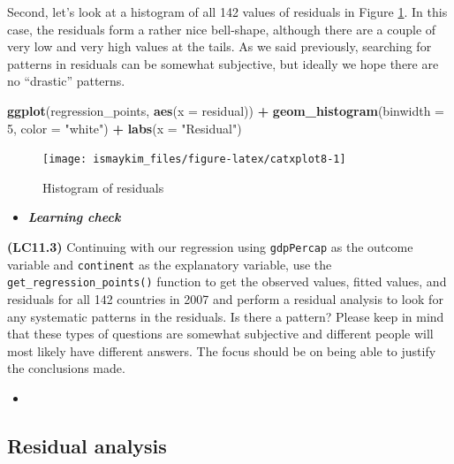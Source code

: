 \documentclass[12pt, krantz2,]{krantz}
\makeatletter
\newenvironment{Shaded}{\begin{snugshade}}{\end{snugshade}}
\newcommand{\DataTypeTok}[1]{\textcolor[rgb]{0.27,0.27,0.27}{#1}}
\newcommand{\DecValTok}[1]{\textcolor[rgb]{0.06,0.06,0.06}{#1}}
\newcommand{\KeywordTok}[1]{\textcolor[rgb]{0.27,0.27,0.27}{\textbf{#1}}}
\newcommand{\NormalTok}[1]{#1}
\newcommand{\OperatorTok}[1]{\textcolor[rgb]{0.43,0.43,0.43}{\textbf{#1}}}
\newcommand{\StringTok}[1]{\textcolor[rgb]{0.5,0.5,0.5}{#1}}
\newenvironment{kframe}{%
\medskip{}
\setlength{\fboxsep}{.8em}
 \def\at@end@of@kframe{}%
 \ifinner\ifhmode%
  \def\at@end@of@kframe{\end{minipage}}%
  \begin{minipage}{\columnwidth}%
 \fi\fi%
 \def\FrameCommand##1{\hskip\@totalleftmargin \hskip-\fboxsep
 \colorbox{shadecolor}{##1}\hskip-\fboxsep
     \hskip-\linewidth \hskip-\@totalleftmargin \hskip\columnwidth}%
 \MakeFramed {\advance\hsize-\width
   \@totalleftmargin\z@ \linewidth\hsize
   \@setminipage}}%
 {\par\unskip\endMakeFramed%
 \at@end@of@kframe}
\renewenvironment{Shaded}{\begin{kframe}}{\end{kframe}}
\newenvironment{rmdblock}[1]
  {\begin{shaded*}
  \begin{itemize}
  \renewcommand{\labelitemi}{
    \raisebox{-.7\height}[0pt][0pt]{
    }
  }
  \item
  }
  {
  \end{itemize}
  \end{shaded*}
  }
\newenvironment{learncheck}
  {\begin{rmdblock}{warning}}
  {\end{rmdblock}}
\makeatother
\begin{document}
Second, let's look at a histogram of all 142 values of
residuals in Figure \ref{fig:catxplot8}. In this case, the residuals form a
rather nice bell-shape, although there are a couple of very low and very high
values at the tails. As we said previously, searching for patterns in residuals
can be somewhat subjective, but ideally we hope there are no ``drastic'' patterns.

\begin{Shaded}
\begin{Highlighting}[]
\KeywordTok{ggplot}\NormalTok{(regression_points, }\KeywordTok{aes}\NormalTok{(}\DataTypeTok{x =}\NormalTok{ residual)) }\OperatorTok{+}
\StringTok{  }\KeywordTok{geom_histogram}\NormalTok{(}\DataTypeTok{binwidth =} \DecValTok{5}\NormalTok{, }\DataTypeTok{color =} \StringTok{"white"}\NormalTok{) }\OperatorTok{+}
\StringTok{  }\KeywordTok{labs}\NormalTok{(}\DataTypeTok{x =} \StringTok{"Residual"}\NormalTok{)}
\end{Highlighting}
\end{Shaded}

\begin{figure}

{\centering \texttt{[image: ismaykim\_files/figure-latex/catxplot8-1]} 

}

\caption{Histogram of residuals}\label{fig:catxplot8}
\end{figure}

\begin{learncheck}
\textbf{\emph{Learning check}}
\end{learncheck}

\textbf{(LC11.3)} Continuing with our regression using \texttt{gdpPercap} as the outcome variable and \texttt{continent} as the explanatory variable, use the \texttt{get\_regression\_points()} function to get the observed values, fitted values, and residuals for all 142 countries in 2007 and perform a residual analysis to look for any systematic patterns in the residuals. Is there a pattern? Please keep in mind that these types of questions are somewhat subjective and different people will most likely have different answers. The focus should be on being able to justify the conclusions made.

\begin{learncheck}

\end{learncheck}

\hypertarget{model3residuals}{%
\subsection{Residual analysis}\label{model3residuals}}
\end{document}
